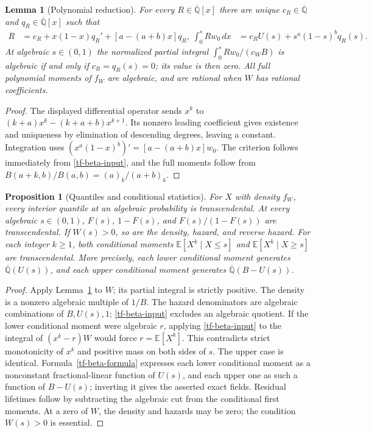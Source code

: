 \documentclass[11pt,a4paper]{article}
\newtheorem{proposition}[theorem]{Proposition}
\newtheorem{lemma}[theorem]{Lemma}
\theoremstyle{definition}
\theoremstyle{remark}
\numberwithin{equation}{section}
\newcommand{\Qbar}{\overline{\mathbb Q}}
\begin{document}
\begin{lemma}[Polynomial reduction]\label{tf-beta-reduction}
For every $R\in\Qbar[x]$ there are unique $c_R\in\Qbar$ and
$q_R\in\Qbar[x]$ such that
\begin{align}
 R&=c_R+x(1-x)q_R'+[a-(a+b)x]q_R,\
 \int_0^s Rw_0\,dx&=c_RU(s)+s^a(1-s)^bq_R(s).
 \label{tf-beta-formula}
\end{align}
At algebraic $s\in(0,1)$ the normalized partial integral
$\int_0^s Rw_0/(c_WB)$ is algebraic if and only if
$c_R=q_R(s)=0$; its value is then zero.
All full polynomial moments of $f_W$ are algebraic, and are rational
when $W$ has rational coefficients.
\end{lemma}
\begin{proof}
The displayed differential operator sends $x^k$ to
$(k+a)x^k-(k+a+b)x^{k+1}$.  Its nonzero leading coefficient gives
existence and uniqueness by elimination of descending degrees, leaving
a constant.  Integration uses
$(x^a(1-x)^b)'=[a-(a+b)x]w_0$.
The criterion follows immediately from \eqref{tf-beta-input}, and the
full moments follow from
$B(a+k,b)/B(a,b)=(a)_k/(a+b)_k$.
\end{proof}

\begin{proposition}[Quantiles and conditional statistics]\label{tf-beta-stats}
For $X$ with density $f_W$, every interior quantile at an algebraic
probability is transcendental.  At every algebraic $s\in(0,1)$,
$F(s)$, $1-F(s)$, and $F(s)/(1-F(s))$ are transcendental.
If $W(s)>0$, so are the density, hazard, and reverse hazard.
For each integer $k\ge1$, both conditional moments
$\mathbb E[X^k\mid X\le s]$ and
$\mathbb E[X^k\mid X\ge s]$ are transcendental.  More precisely, each lower conditional moment
generates $\Qbar(U(s))$, and each upper conditional moment generates
$\Qbar(B-U(s))$.
\end{proposition}
\begin{proof}
Apply Lemma~\ref{tf-beta-reduction} to $W$; its partial integral is
strictly positive.  The density is a nonzero algebraic multiple of
$1/B$.  The hazard denominators are algebraic combinations of $B,U(s),1$;
\eqref{tf-beta-input} excludes an algebraic quotient.
If the lower conditional moment were algebraic $r$, applying
\eqref{tf-beta-input} to the integral of $(x^k-r)W$ would force
$r=\mathbb E[X^k]$.  This contradicts strict monotonicity of $x^k$
and positive mass on both sides of $s$.  The upper case is identical.  Formula~\eqref{tf-beta-formula}
expresses each lower conditional moment as a nonconstant fractional-linear
function of $U(s)$, and each upper one as such a function of $B-U(s)$;
inverting it gives the asserted exact fields.
Residual lifetimes follow by subtracting the algebraic cut from the
conditional first moments.  At a zero of $W$, the density and hazards
may be zero; the condition $W(s)>0$ is essential.
\end{proof}
\end{document}
